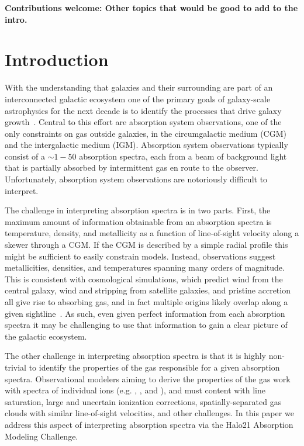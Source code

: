 \documentclass[fleqn,usenatbib]{mnras}
\newcommand{\thoughts}[1]{\textcolor{BurntOrange}{\textbf{Contributions welcome: #1}}}
\begin{document}
\thoughts{
Other topics that would be good to add to the intro.
}

\section{Introduction}

With the understanding that galaxies and their surrounding are part of an interconnected galactic ecosystem one of the primary goals of galaxy-scale astrophysics for the next decade is to identify the processes that drive galaxy growth~\citep{Decadal2020}.
Central to this effort are absorption system observations, one of the only constraints on gas outside galaxies, in the circumgalactic medium (CGM) and the intergalactic medium (IGM).
Absorption system observations typically consist of a $\sim 1-50$ absorption spectra, each from a beam of background light that is partially absorbed by intermittent gas en route to the observer.
Unfortunately, absorption system observations are notoriously difficult to interpret.

The challenge in interpreting absorption spectra is in two parts.
First, the maximum amount of information obtainable from an absorption spectra is temperature, density, and metallicity as a function of line-of-sight velocity along a skewer through a CGM.
If the CGM is described by a simple radial profile this might be sufficient to easily constrain models.
Instead, observations suggest metallicities, densities, and temperatures spanning many orders of magnitude.
This is consistent with cosmological simulations, which predict wind from the central galaxy, wind and stripping from satellite galaxies, and pristine accretion all give rise to absorbing gas, and in fact multiple origins likely overlap along a given sightline~\citep[e.g.][]{Hafen2019, Hafen2020}.
As such, even given perfect information from each absorption spectra it may be challenging to use that information to gain a clear picture of the galactic ecosystem.

The other challenge in interpreting absorption spectra is that it is highly non-trivial to identify the properties of the gas responsible for a given absorption spectra.
Observational modelers aiming to derive the properties of the gas work with spectra of individual ions (e.g. , , and ), and must content with line saturation, large and uncertain ionization corrections, spatially-separated gas clouds with similar line-of-sight velocities, and other challenges.
In this paper we address this aspect of interpreting absorption spectra via the Halo21 Absorption Modeling Challenge.
\end{document}
